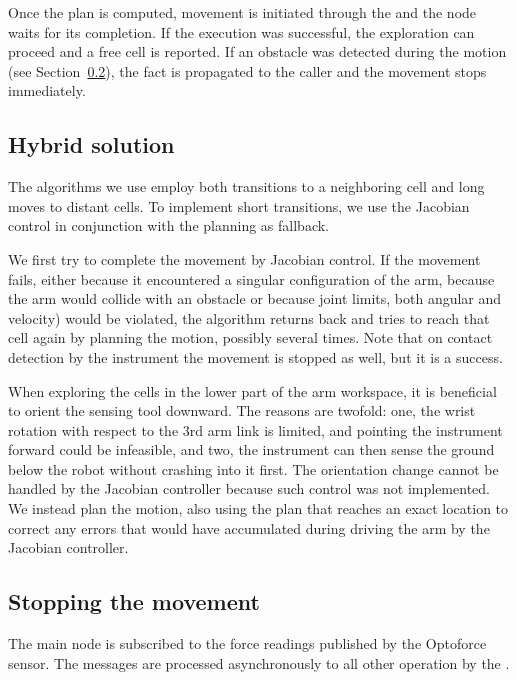 \documentclass[buriama8_dp.tex]{subfiles}
\begin{document}
Once the plan is computed, movement is initiated through the  and the node waits for its completion. If the execution was successful, the exploration can proceed and a free cell is reported. If an obstacle was detected during the motion (see Section~\ref{subsec:impl_stop}), the fact is propagated to the caller and the movement stops immediately.

\subsection{Hybrid solution}
\label{subsec:impl_drv}


The algorithms we use employ both transitions to a neighboring cell and long moves to distant cells. To implement short transitions, we use the Jacobian control in conjunction with the planning as fallback.

We first try to complete the movement by Jacobian control. If the movement fails, either because it encountered a singular configuration of the arm, because the arm would collide with an obstacle or because joint limits, both angular and velocity) would be violated, the algorithm returns back and tries to reach that cell again by planning the motion, possibly several times. Note that on contact detection by the instrument the movement is stopped as well, but it is a success.

When exploring the cells in the lower part of the arm workspace, it is beneficial to orient the sensing tool downward. The reasons are twofold: one, the wrist rotation with respect to the 3rd arm link is limited, and pointing the instrument forward could be infeasible, and two, the instrument can then sense the ground below the robot without crashing into it first. The orientation change cannot be handled by the Jacobian controller because such control was not implemented. We instead plan the motion, also using the plan that reaches an exact location to correct any errors that would have accumulated during driving the arm by the Jacobian controller.

\subsection{Stopping the movement}
\label{subsec:impl_stop}

The main node is subscribed to the force readings published by the Optoforce sensor. The messages are processed asynchronously to all other operation by the .
\end{document}
